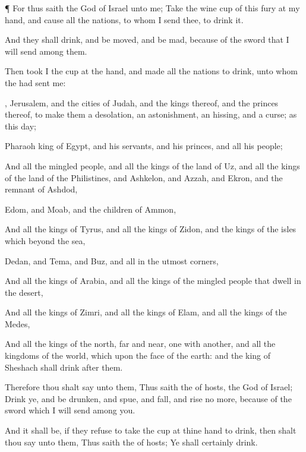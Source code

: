 {\par }{\PP {}¶ For thus
saith the
{}
God of
Israel unto me;
Take the
wine
cup of this
fury at my
hand, and cause all the
nations, to whom I
send thee, to
drink it.

And they shall
drink, and be
moved, and be
mad,
because of the
sword that I will
send among them.

Then
took I the
cup at the
{}
hand, and made all the
nations to
drink, unto whom the
{} had
sent me:

,
Jerusalem, and the
cities of
Judah, and the
kings thereof, and the
princes thereof, to
make them a
desolation, an
astonishment, an
hissing, and a
curse; as
{} this
day;

Pharaoh
king of
Egypt, and his
servants, and his
princes, and all his
people;

And all the
mingled people, and all the
kings of the
land of
Uz, and all the
kings of the
land of the
Philistines, and
Ashkelon, and
Azzah, and
Ekron, and the
remnant of
Ashdod,

Edom, and
Moab, and the
children of
Ammon,

And all the
kings of
Tyrus, and all the
kings of
Zidon, and the
kings of the
isles which
{}
beyond the
sea,

Dedan, and
Tema, and
Buz, and all
{} in the
utmost
corners,

And all the
kings of
Arabia, and all the
kings of the mingled
people that
dwell in the
desert,

And all the
kings of
Zimri, and all the
kings of
Elam, and all the
kings of the
Medes,

And all the
kings of the
north,
far and
near,
one with
another, and all the
kingdoms of the
world, which
{} upon the
face of the
earth: and the
king of
Sheshach shall
drink
after them.

Therefore thou shalt
say unto them, Thus
saith the
{} of
hosts, the
God of
Israel;
Drink ye, and be
drunken, and
spue, and
fall, and
rise no more,
because of the
sword which I will
send among you.

And it shall be, if they
refuse to
take the
cup at thine
hand to
drink, then shalt thou
say unto them, Thus
saith the
{} of
hosts; Ye shall
certainly
drink.

}
